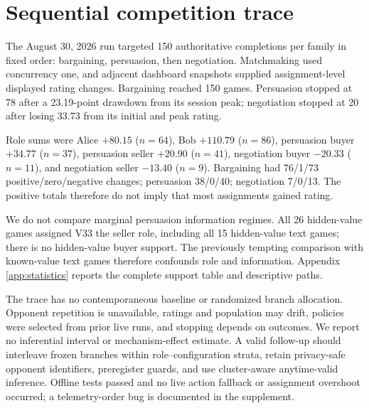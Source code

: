 \section{Sequential competition trace}



The August 30, 2026 run targeted 150 authoritative completions per family in
fixed order: bargaining, persuasion, then negotiation. Matchmaking used
concurrency one, and adjacent dashboard snapshots supplied assignment-level
displayed rating changes. Bargaining reached 150 games. Persuasion stopped at
78 after a 23.19-point drawdown from its session peak; negotiation stopped at
20 after losing 33.73 from its initial and peak rating.

Role sums were Alice $+80.15$ ($n=64$), Bob $+110.79$ ($n=86$), persuasion
buyer $+34.77$ ($n=37$), persuasion seller $+20.90$ ($n=41$), negotiation buyer
$-20.33$ ($n=11$), and negotiation seller $-13.40$ ($n=9$). Bargaining had
76/1/73 positive/zero/negative changes; persuasion 38/0/40; negotiation 7/0/13.
The positive totals therefore do not imply that most assignments gained rating.

We do not compare marginal persuasion information regimes. All 26 hidden-value
games assigned V33 the seller role, including all 15 hidden-value text games;
there is no hidden-value buyer support. The previously tempting comparison with
known-value text games therefore confounds role and information. Appendix~
\ref{app:statistics} reports the complete support table and descriptive paths.

The trace has no contemporaneous baseline or randomized branch allocation.
Opponent repetition is unavailable, ratings and population may drift, policies
were selected from prior live runs, and stopping depends on outcomes. We report
no inferential interval or mechanism-effect estimate. A valid follow-up should
interleave frozen branches within role--configuration strata, retain privacy-safe
opponent identifiers, preregister guards, and use cluster-aware anytime-valid
inference. Offline tests passed and no live action fallback or assignment
overshoot occurred; a telemetry-order bug is documented in the supplement.
